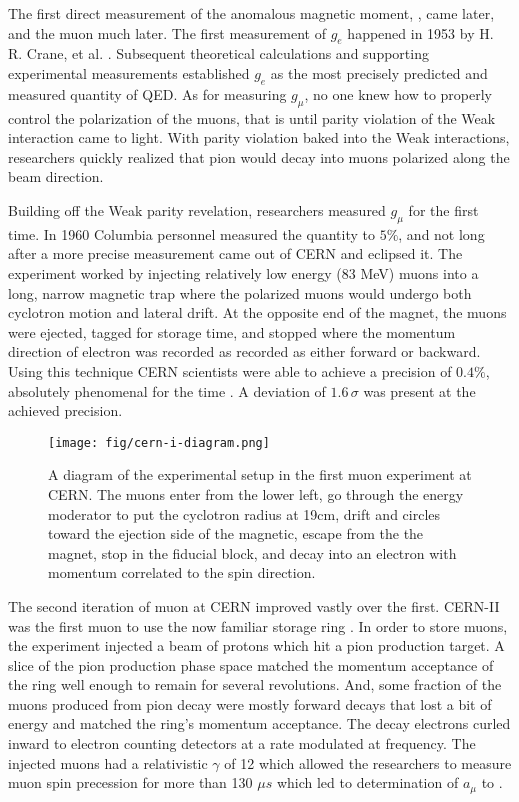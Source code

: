 The first direct measurement of the anomalous magnetic moment, \gmtwo, came later, and the muon \gmtwo much later.  The first measurement of $g_e$ happened in 1953 by H. R. Crane, et al. .  Subsequent theoretical calculations and supporting experimental measurements established $g_e$ as the most precisely predicted and measured quantity of QED.  As for measuring $g_\mu$, no one knew how to properly control the polarization of the muons, that is until parity violation of the Weak interaction came to light.  With parity violation baked into the Weak interactions, researchers quickly realized that pion would decay into muons polarized along the beam direction.  

Building off the Weak parity revelation, researchers measured $g_\mu$ for the first time.  In 1960 Columbia personnel measured the quantity to $5\%$, and not long after a more precise measurement came out of CERN and eclipsed it.  The experiment worked by injecting relatively low energy (83 MeV) muons into a long, narrow magnetic trap where the polarized muons would undergo both cyclotron motion and lateral drift. At the opposite end of the magnet, the muons were ejected, tagged for storage time, and stopped where the momentum direction of electron was recorded as recorded as either forward or backward.  Using this technique CERN scientists were able to achieve a precision of $0.4\%$, absolutely phenomenal for the time \cite{cern-i}.  A deviation of $1.6\,\sigma$ was present at the achieved precision.

\begin{figure}
\centering
\texttt{[image: fig/cern-i-diagram.png]}
\label{fig:cern-i-diagram}
\caption{A diagram of the experimental setup in the first muon \gmtwo experiment at CERN. The muons enter from the lower left, go through the energy moderator to put the cyclotron radius at 19cm, drift and circles toward the ejection side of the magnetic, escape from the the magnet, stop in the fiducial block, and decay into an electron with momentum correlated to the spin direction.}
\end{figure}

The second iteration of muon \gmtwo at CERN improved vastly over the first.  CERN-II was the first muon \gmtwo to use the now familiar storage ring \cite{47y-muon-g-2}.  In order to store muons, the experiment injected a beam of protons which hit a pion production target.  A slice of the pion production phase space matched the momentum acceptance of the ring well enough to remain for several revolutions. And, some fraction of the muons produced from pion decay were mostly forward decays that lost a bit of energy and matched the ring's momentum acceptance.  The decay electrons curled inward to electron counting detectors at a rate modulated at \gmtwo frequency.  The injected muons had a relativistic $\gamma$ of 12 which allowed the researchers to measure muon spin precession for more than 130 $\mu s$ which led to determination of $a_\mu$ to .

